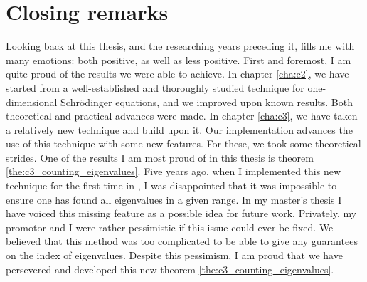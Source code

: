 


\chapter*{Closing remarks}

Looking back at this thesis, and the researching years preceding it, fills me with many emotions: both positive, as well as less positive. First and foremost, I am quite proud of the results we were able to achieve. In chapter \ref{cha:c2}, we have started from a well-established and thoroughly studied technique for one-dimensional Schrödinger equations, and we improved upon known results. Both theoretical and practical advances were made. In chapter \ref{cha:c3}, we have taken a relatively new technique and build upon it. Our implementation advances the use of this technique with some new features. For these, we took some theoretical strides. One of the results I am most proud of in this thesis is theorem \ref{the:c3_counting_eigenvalues}. Five years ago, when I implemented this new technique for the first time in \matlab{}, I was disappointed that it was impossible to ensure one has found all eigenvalues in a given range. In my master's thesis I have voiced this missing feature as a possible idea for future work. Privately, my promotor and I were rather pessimistic if this issue could ever be fixed. We believed that this method was too complicated to be able to give any guarantees on the index of eigenvalues. Despite this pessimism, I am proud that we have persevered and developed this new theorem \ref{the:c3_counting_eigenvalues}.

